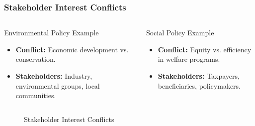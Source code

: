 \documentclass[10pt]{beamer}
\begin{document}
    \begin{frame}
    \frametitle{Stakeholder Interest Conflicts}
    \begin{columns}[T,onlytextwidth]
        \begin{block}{Environmental Policy Example}
            \begin{itemize}
                \item \textbf{Conflict:} Economic development vs. conservation.
                \item \textbf{Stakeholders:} Industry, environmental groups, local communities.
            \end{itemize}
        \end{block}
        \begin{block}{Social Policy Example}
            \begin{itemize}
                \item \textbf{Conflict:} Equity vs. efficiency in welfare programs.
                \item \textbf{Stakeholders:} Taxpayers, beneficiaries, policymakers.
            \end{itemize}
        \end{block}
    \end{columns}
    
    \begin{figure}
        \centering
        \caption{Stakeholder Interest Conflicts}
    \end{figure}
    \end{frame}
    
\end{document}
